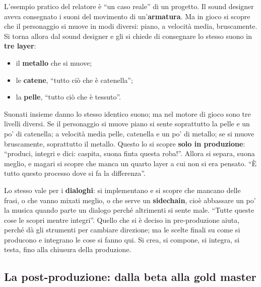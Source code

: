 L'esempio pratico del relatore è ``un caso reale'' di un progetto. Il sound
designer aveva consegnato i suoni del movimento di un'\textbf{armatura}. Ma in
gioco si scopre che il personaggio si muove in modi diversi: piano, a velocità
media, bruscamente. Si torna allora dal sound designer e gli si chiede di
consegnare lo stesso suono in \textbf{tre layer}:
\begin{itemize}
  \item il \textbf{metallo} che si muove;
  \item le \textbf{catene}, ``tutto ciò che è catenella'';
  \item la \textbf{pelle}, ``tutto ciò che è tessuto''.
\end{itemize}
Suonati insieme danno lo stesso identico suono; ma nel motore di gioco sono tre
livelli diversi. Se il personaggio si muove piano si sente soprattutto la pelle e
un po' di catenella; a velocità media pelle, catenella e un po' di metallo; se si
muove bruscamente, soprattutto il metallo. Questo lo si scopre \textbf{solo in
produzione}: ``produci, integri e dici: caspita, suona finta questa roba!''.
Allora si separa, suona meglio, e magari si scopre che manca un quarto layer a
cui non si era pensato. ``È tutto questo processo dove si fa la differenza''.

Lo stesso vale per i \textbf{dialoghi}: si implementano e si scopre che mancano
delle frasi, o che vanno mixati meglio, o che serve un \textbf{sidechain}, cioè
abbassare un po' la musica quando parte un dialogo perché altrimenti si sente
male. ``Tutte queste cose le scopri mentre integri''. Quello che si è deciso in
pre-produzione aiuta, perché dà gli strumenti per cambiare direzione; ma le
scelte finali su come si producono e integrano le cose si fanno qui. Si crea, si
compone, si integra, si testa, fino alla chiusura della produzione.

\subsection{La post-produzione: dalla beta alla gold master}

